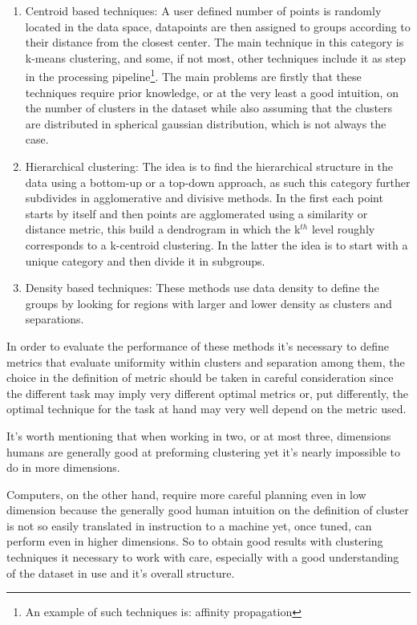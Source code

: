 \begin{enumerate}
\item Centroid based techniques: A user defined number of points is randomly located in the data space, datapoints are then assigned to groups according to their distance from the closest center. The main technique in this category is k-means clustering, and some, if not most, other techniques include it as step in the processing pipeline\footnote{An example of such techniques is: affinity propagation}. The main problems are firstly that these techniques require prior knowledge, or at the very least a good intuition, on the number of clusters in the dataset  while also assuming that the clusters are distributed in spherical gaussian distribution, which is not always the case.
\item Hierarchical clustering: The idea is to find the hierarchical structure in the data using a bottom-up or a top-down approach, as such this category further subdivides in agglomerative and divisive methods. In the first each point starts by itself and then points are agglomerated using a similarity or distance metric, this build a dendrogram in which the k$^{th}$ level roughly corresponds to a k-centroid clustering. In the latter the idea is to start with a unique category and then divide it in subgroups.
\item Density based techniques: These methods use data density to define the groups by looking for regions with larger and lower density as clusters and separations.
\end{enumerate}

In order to evaluate the performance of these methods it's necessary to define metrics that evaluate uniformity within clusters and separation among them, the choice in the definition of metric should be taken in careful consideration since the different task may imply very different optimal metrics or, put differently, the optimal technique for the task at hand may very well depend on the metric used.

It's worth mentioning that when working in two, or at most three, dimensions humans are generally good at preforming clustering yet it's nearly impossible to do in more dimensions. 

Computers, on the other hand, require more careful planning even in low dimension because the generally good human intuition on the definition of cluster is not so easily translated in instruction to a machine yet, once tuned, can perform even in higher dimensions. So to obtain good results with clustering techniques it necessary to work with care, especially with a good understanding of the dataset in use and it's overall structure.

